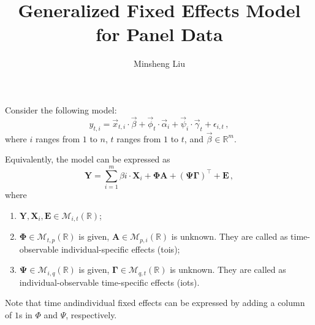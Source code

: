 \documentclass{tufte-handout}
\newenvironment{inlinenum}
    {\begin{enumerate}
      [ itemsep    = -1mm
      , topsep     = -1mm
      , leftmargin = .5in
      ]}
    {\vskip 1mm\end{enumerate}}
\begin{document}
  \title{Generalized Fixed Effects Model for Panel Data}
  \author{Minsheng Liu}
  \maketitle

  \newcommand \Mat[1]{\mathcal{M}_{#1}(\mathbb{R})}

  Consider the following model:
  \[ y_{t, i} = \vec{x}_{t, i} \cdot \vec{\beta} 
              + \vec{\phi}_t \cdot \vec{\alpha}_i
              + \vec{\psi}_i \cdot \vec{\gamma}_t
              + \epsilon_{i, t} \, , \]
  where $i$ ranges from $1$ to $n$, $t$ ranges from $1$ to $t$,
  and $\vec{\beta} \in \mathbb{R}^m$.

  Equivalently, the model can be expressed as
  \[ \mathbf{Y} = \sum_{i = 1}^m \beta{i} \cdot \mathbf{X}_i
                + \mathbf{\Phi}\mathbf{A}
                + (\mathbf{\Psi}\mathbf{\Gamma})^{\top}
                + \mathbf{E} \, , \]
  where
  \begin{inlinenum}
    \item $\mathbf{Y}, \mathbf{X}_i, \mathbf{E} \in \Mat{i, t}$;
    \item $\mathbf{\Phi} \in \Mat{t, p}$ is given,
          $\mathbf{A} \in \Mat{p, i}$ is unknown.
          They are called as time-observable individual-specific effects (tois);
    \item $\mathbf{\Psi} \in \Mat{i, q}$ is given,
          $\mathbf{\Gamma} \in \Mat{q, t}$ is unknown.
          They are called as individual-observable time-specific effects (iots).
  \end{inlinenum}

  Note that time andindividual fixed effects can be expressed by adding a column
  of $1$s in $\Phi$ and $\Psi$, respectively.
\end{document}
